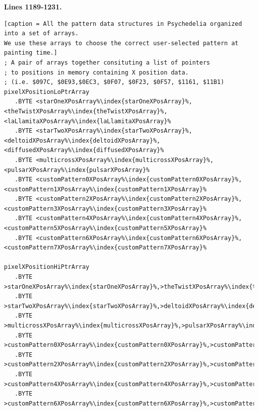 \clearpage
\textbf{Lines 1189-1231. } 
\begin{lstlisting}[escapechar=\%][caption = All the pattern data structures in Psychedelia organized into a set of arrays. 
We use these arrays to choose the correct user-selected pattern at painting time.]
; A pair of arrays together consituting a list of pointers
; to positions in memory containing X position data.
; (i.e. $097C, $0E93,$0EC3, $0F07, $0F23, $0F57, $1161, $11B1)
pixelXPositionLoPtrArray
   .BYTE <starOneXPosArray%\index{starOneXPosArray}%,<theTwistXPosArray%\index{theTwistXPosArray}%,<laLlamitaXPosArray%\index{laLlamitaXPosArray}%
   .BYTE <starTwoXPosArray%\index{starTwoXPosArray}%,<deltoidXPosArray%\index{deltoidXPosArray}%,<diffusedXPosArray%\index{diffusedXPosArray}%
   .BYTE <multicrossXPosArray%\index{multicrossXPosArray}%,<pulsarXPosArray%\index{pulsarXPosArray}%
   .BYTE <customPattern0XPosArray%\index{customPattern0XPosArray}%,<customPattern1XPosArray%\index{customPattern1XPosArray}%
   .BYTE <customPattern2XPosArray%\index{customPattern2XPosArray}%,<customPattern3XPosArray%\index{customPattern3XPosArray}%
   .BYTE <customPattern4XPosArray%\index{customPattern4XPosArray}%,<customPattern5XPosArray%\index{customPattern5XPosArray}%
   .BYTE <customPattern6XPosArray%\index{customPattern6XPosArray}%,<customPattern7XPosArray%\index{customPattern7XPosArray}%

pixelXPositionHiPtrArray 
   .BYTE >starOneXPosArray%\index{starOneXPosArray}%,>theTwistXPosArray%\index{theTwistXPosArray}%,>laLlamitaXPosArray%\index{laLlamitaXPosArray}%
   .BYTE >starTwoXPosArray%\index{starTwoXPosArray}%,>deltoidXPosArray%\index{deltoidXPosArray}%,>diffusedXPosArray%\index{diffusedXPosArray}%
   .BYTE >multicrossXPosArray%\index{multicrossXPosArray}%,>pulsarXPosArray%\index{pulsarXPosArray}%
   .BYTE >customPattern0XPosArray%\index{customPattern0XPosArray}%,>customPattern1XPosArray%\index{customPattern1XPosArray}%
   .BYTE >customPattern2XPosArray%\index{customPattern2XPosArray}%,>customPattern3XPosArray%\index{customPattern3XPosArray}%
   .BYTE >customPattern4XPosArray%\index{customPattern4XPosArray}%,>customPattern5XPosArray%\index{customPattern5XPosArray}%
   .BYTE >customPattern6XPosArray%\index{customPattern6XPosArray}%,>customPattern7XPosArray%\index{customPattern7XPosArray}%



\end{lstlisting}

